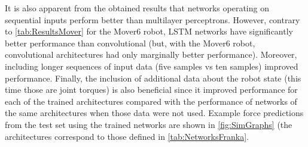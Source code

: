 It is also apparent from the obtained results that networks operating on sequential inputs perform better than multilayer perceptrons. However, contrary to \cref{tab:ResultsMover} for the Mover6 robot, LSTM networks have significantly better performance than convolutional (but, with the Mover6 robot, convolutional architectures had only marginally better performance). Moreover, including longer sequences of input data (five samples vs ten samples) improved performance. Finally, the inclusion of additional data about the robot state (this time those are joint torques) is also beneficial since it improved performance for each of the trained architectures compared with the performance of networks of the same architectures when those data were not used. Example force predictions from the test set using the trained networks are shown in \cref{fig:SimGraphs} (the architectures correspond to those defined in \cref{tab:NetworksFranka}.


